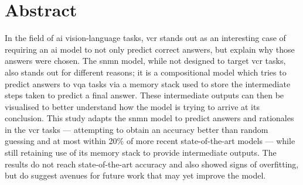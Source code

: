 \chapter*{Abstract}

In the field of \gls{ai} vision-language tasks, \gls{vcr} stands out as an interesting case of requiring an \gls{ai} model to not only predict correct answers, but explain why those answers were chosen.
The \gls{snmn} model, while not designed to target \gls{vcr} tasks, also stands out for different reasons; it is a compositional model which tries to predict answers to \gls{vqa} tasks via a memory stack used to store the intermediate steps taken to predict a final answer.
These intermediate outputs can then be visualised to better understand how the model is trying to arrive at its conclusion.
This study adapts the \gls{snmn} model to predict answers and rationales in the \gls{vcr} tasks --- attempting to obtain an accuracy better than random guessing and at most within 20\% of more recent state-of-the-art models --- while still retaining use of its memory stack to provide intermediate outputs.
The results do not reach state-of-the-art accuracy and also showed signs of overfitting, but do suggest avenues for future work that may yet improve the model.
